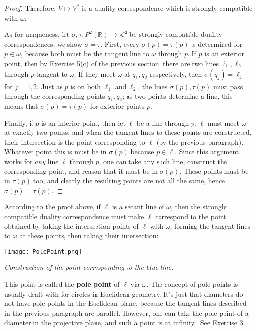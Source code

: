 \documentclass[leqno]{book}
\begin{document}
\begin{proof}
Therefore, $V\mapsto V^*$ is a duality correspondence which is strongly compatible with $\omega$.

As for uniqueness, let $\sigma,\tau:P^2(\mathbb R)\to\mathcal L^2$ be strongly compatible duality correspondences; we show $\sigma=\tau$.  First, every $\sigma(p)=\tau(p)$ is determined for $p\in\omega$, because both must be the tangent line to $\omega$ through $p$.  If $p$ is an exterior point, then by Exercise 5(c) of the previous section, there are two lines $\ell_1,\ell_2$ through $p$ tangent to $\omega$.  If they meet $\omega$ at $q_1,q_2$ respectively, then $\sigma(q_j)=\ell_j$ for $j=1,2$.  Just as $p$ is on both $\ell_1$ and $\ell_2$, the lines $\sigma(p),\tau(p)$ must pass through the corresponding points $q_1,q_2$; as two points determine a line, this means that $\sigma(p)=\tau(p)$ for exterior points $p$.

Finally, if $p$ is an interior point, then let $\ell$ be a line through $p$.  $\ell$ must meet $\omega$ at exactly two points; and when the tangent lines to these points are constructed, their intersection is the point corresponding to $\ell$ (by the previous paragraph).  Whatever point this is must be in $\sigma(p)$ because $p\in\ell$.  Since this argument works for \emph{any} line $\ell$ through $p$, one can take any such line, construct the corresponding point, and reason that it must be in $\sigma(p)$.  These points must be in $\tau(p)$ too, and clearly the resulting points are not all the same, hence $\sigma(p)=\tau(p)$.
\end{proof}

\noindent According to the proof above, if $\ell$ is a secant line of $\omega$, then the strongly compatible duality correspondence must make $\ell$ correspond to the point obtained by taking the intersection points of $\ell$ with $\omega$, forming the tangent lines to $\omega$ at these points, then taking their intersection:
\begin{center}
\texttt{[image: PolePoint.png]}

\emph{Construction of the point corresponding to the blue line.}
\end{center}
This point is called the \textbf{pole point} of $\ell$ via $\omega$.  The concept of pole points is usually dealt with for circles in Euclidean geometry.  It's just that diameters do not have pole points in the Euclidean plane, because the tangent lines described in the previous paragraph are parallel.  However, one can take the pole point of a diameter in the projective plane, and such a point is at infinity.  [See Exercise 3.]
\end{document}
